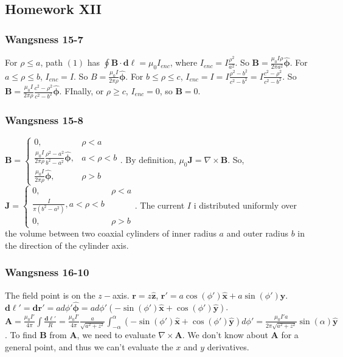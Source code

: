 \documentclass[oneside]{book}
\theoremstyle{definition}
\newcommand*\B[1]{\mathbf{#1}}
\newcommand*\Bh[1]{\mathbf{\hat{#1}}}
\begin{document}
\subsection*{Homework XII}

\subsubsection{Wangsness 15-7}

For $\rho\leq a$, path $(1)$ has $\oint \B{B}\cdot \B{d\ell}= \mu_0 I_{enc}$, where $I_{enc} = I\frac{\rho^2}{a^2}$. So $\B{B} = \frac{\mu_0 I\rho}{2\pi a^2} \Bh{\phi}$. For $a\leq \rho \leq b$, $I_{enc} = I$. So $B = \frac{\mu_0 I}{2\pi \rho} \Bh{\phi}$. For $b\leq \rho \leq c$, $I_{enc} = I =I\frac{\rho^2-b^2}{c^2-b^2} = I\frac{c^2-\rho^2}{c^2-b^2}$. So $\B{B} = \frac{\mu_0 I}{2\pi \rho} \frac{c^2-\rho^2}{c^2-b^2}\Bh{\phi}$. FInally, or $\rho \geq c$, $I_{enc} = 0$, so $\B{B} = 0$.

\begin{figure}[!h]
  \centering
\end{figure}


\subsubsection{Wangsness 15-8}

$\B{B} = \begin{cases} 0, & \rho < a \\ \frac{\mu_0 I}{2\pi \rho}\frac{\rho^2-a^2}{b^2-a^2}\Bh{\phi}, & a<\rho < b \\ \frac{\mu_0 I}{2\pi \rho} \Bh{\phi}, & \rho>b\end{cases}$. By definition, $\mu_0 \B{J} = \nabla \times \B{B}$. So, $\B{J} = \begin{cases} 0, & \rho<a\\ \frac{I}{\pi(b^2-a^2)}, a<\rho < b\\ 0, & \rho>b \end{cases}$. The current $I$ i distributed uniformly over the volume between two coaxial cylinders of inner radius $a$ and outer radius $b$ in the direction of the cylinder axis.

\subsubsection{Wangsness 16-10}

The field point is on the $z-$axis. $\B{r} = z\Bh{z}$, $\B{r}' =  a\cos(\phi')\Bh{x}+a\sin(\phi')\Bh{y}$. $\B{d\ell}' = \B{dr}' = ad\phi' \Bh{\phi} = ad\phi' (-\sin(\phi')\Bh{x}+\cos(\phi')\Bh{y})$. $\B{A} = \frac{\mu_0 I'}{4\pi} \int \frac{\B{d\ell}'}{R} = \frac{\mu_0 I'}{4\pi} \frac{a}{\sqrt{a^2+z^2}}\int_{-\alpha}^{\alpha} (-\sin(\phi')\Bh{x}+\cos(\phi')\Bh{y})d\phi' = \frac{\mu_0 I'a}{2\pi \sqrt{a^2+z^2}}\sin(\alpha)\Bh{y}$. To find $\B{B}$ from $\B{A}$, we need to evaluate $\nabla \times \B{A}$. We don't know about $\B{A}$ for a general point, and thus we can't evaluate the $x$ and $y$ derivatives.
\end{document}
